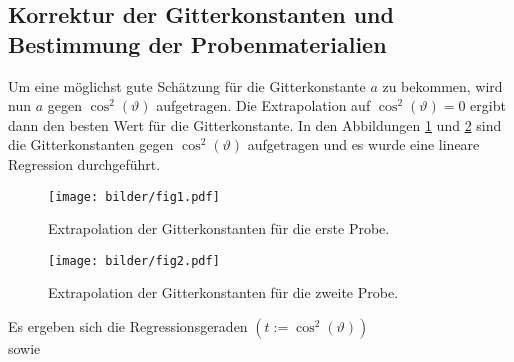 \subsection{Korrektur der Gitterkonstanten und Bestimmung der Probenmaterialien}
Um eine möglichst gute Schätzung für die Gitterkonstante $a$ zu bekommen, wird nun
$a$ gegen $\cos^2(\vartheta)$ aufgetragen. Die Extrapolation auf
$\cos^2(\vartheta)=0$ ergibt dann den besten Wert für die Gitterkonstante. In
den Abbildungen \ref{fig:1} und \ref{fig:2} sind die Gitterkonstanten gegen
$\cos^2(\vartheta)$ aufgetragen und es wurde eine lineare Regression durchgeführt.
\begin{figure}[h]
\centering
\texttt{[image: bilder/fig1.pdf]}
\caption{Extrapolation der Gitterkonstanten für die erste Probe.}
\label{fig:1}
\end{figure}
\begin{figure}[h]
\centering
\texttt{[image: bilder/fig2.pdf]}
\caption{Extrapolation der Gitterkonstanten für die zweite Probe.}
\label{fig:2}
\end{figure}
Es ergeben sich die Regressionsgeraden $(t:=\cos^2(\vartheta))$
\begin{equation}

\end{equation}
sowie
\begin{equation}

\end{equation}
